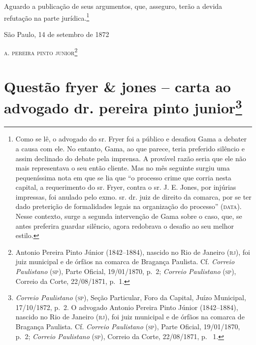 Aguardo a publicação de seus argumentos, que, asseguro, terão a devida
refutação na parte jurídica.\footnote{ Como se lê, o advogado do sr.
  Fryer foi a público e desafiou Gama a debater a causa com ele. No
  entanto, Gama, ao que parece, teria preferido silêncio e assim
  declinado do debate pela imprensa. A provável razão seria que ele não
  mais representava o seu então cliente. Mas no mês seguinte surgiu uma
  pequeníssima nota em que se lia que ``o processo crime que corria nesta
  capital, a requerimento do sr. Fryer, contra o sr. J. E. Jones, por
  injúrias impressas, foi anulado pelo exmo. sr. dr. juiz de direito da
  comarca, por se ter dado preterição de formalidades legais na
  organização do processo'' (\textsc{data}). Nesse contexto, surge a segunda
  intervenção de Gama sobre o caso, que, se antes preferira guardar
  silêncio, agora redobrava o desafio ao seu melhor estilo.}

\begin{flushright}
São Paulo, 14 de setembro de 1872

\textsc{a. pereira pinto junior}\footnote{ Antonio Pereira Pinto Júnior
  (1842--1884), nascido no Rio de Janeiro (\textsc{rj}), foi juiz municipal e de
  órfãos na comarca de Bragança Paulista. Cf. \emph{Correio Paulistano}
  (\textsc{sp}), Parte Oficial, 19/01/1870, p.~2; \emph{Correio Paulistano} (\textsc{sp}),
  Correio da Corte, 22/08/1871, p.~1.}
\end{flushright}

\chapter{Questão fryer \& jones -- carta ao advogado dr. pereira pinto junior\footnote{\emph{Correio Paulistano} (\textsc{sp}), Seção Particular, Foro
  da Capital, Juízo Municipal, 17/10/1872, p.~2. O advogado Antonio
  Pereira Pinto Júnior (1842--1884), nascido no Rio de Janeiro (\textsc{rj}), foi
  juiz municipal e de órfãos na comarca de Bragança Paulista. Cf.
  \emph{Correio Paulistano} (\textsc{sp}), Parte Oficial, 19/01/1870, p.~2;
  \emph{Correio Paulistano} (\textsc{sp}), Correio da Corte, 22/08/1871, p.~ 1.}} %


